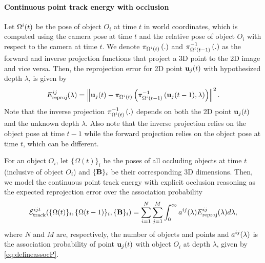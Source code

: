 \vspace{-0.3cm}
\paragraph{Continuous point track energy with occlusion}
Let $\Omega^{i}(t)$ be the pose of object $O_i$ at time $t$ in world coordinates, which is computed using the camera pose at time $t$ and the relative pose of object $O_i$ with respect to the camera at time $t$. We denote $\pi_{\Omega^{i}(t)}\left(.\right)$ and $\pi^{-1}_{\Omega^{i}(t-1)}\left(.\right)$ as the forward and inverse projection functions that project a 3D point to the 2D image and vice versa. Then, the reprojection error for 2D point $\mathbf{u}_j(t)$ with hypothesized depth $\lambda$, is given by
\begin{equation}
E^{ij}_{\text{reproj}}(\lambda) = \left\|\mathbf{u}_j(t) - \pi_{\Omega^{i}(t)}\left(\pi^{-1}_{\Omega^{i}(t-1)}\left(\mathbf{u}_j(t-1), \lambda\right)\right)\right\|^2.
\label{eq:reprojerror}
\end{equation}
Note that the inverse projection $\pi^{-1}_{\Omega^{i}(t)}\left(.\right)$ depends on both the 2D point $\mathbf{u}_j(t)$ and the unknown depth $\lambda$. Also note that the inverse projection relies on the object pose at time $t-1$ while the forward projection relies on the object pose at time $t$, which can be different.

For an object $O_i$, let $\{ \Omega (t) \}_i$ be the poses of all occluding objects at time $t$ (inclusive of object $O_i$) and $ \{ \mathbf{B} \}_i$ be their corresponding 3D dimensions. Then, we model the continuous point track energy with explicit occlusion reasoning as the expected reprojection error over the association probability
\begin{align}
  \mathcal{E}^{ijt}_{\text{track}}(\{ \Omega (t) \}_i, \{ \Omega (t-1) \}_i, \{ \mathbf{B} \}_i )
    = \sum_{i=1}^{N} 
    \sum_{j = 1}^{M}
    \int_0^\infty a^{ij}(\lambda)E^{ij}_{\text{reproj}}(\lambda) d\lambda,
\end{align}
where $N$ and $M$ are, respectively, the number of objects and points and $a^{ij}(\lambda)$ is the association probability of point $\mathbf{u}_j(t)$ with object $O_i$ at depth $\lambda$, given by \eqref{eq:defineassocP}.


